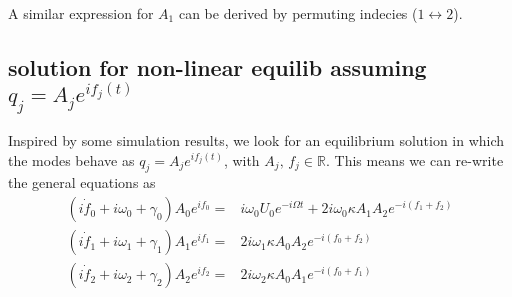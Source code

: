 A similar expression for $A_1$ can be derived by permuting indecies ($1 \leftrightarrow 2$).

\subsection*{solution for non-linear equilib assuming $q_j = A_j e^{i f_j(t)}$}

Inspired by some simulation results, we look for an equilibrium solution in which the modes behave as $q_j = A_j e^{if_j(t)}$, with $A_j,\,f_j \in \mathbb{R}$. This means we can re-write the general equations as
\begin{subequations}
\begin{align}
(i\dot{f}_0 + i\omega_0 + \gamma_0) A_0 e^{if_0} = & i\omega_0 U_0 e^{-i\Omega t} + 2i\omega_0 \kappa A_1 A_2 e^{-i(f_1 + f_2)} \label{subeq:f_0}\\
(i\dot{f}_1 + i\omega_1 + \gamma_1) A_1 e^{if_1} = & 2i\omega_1 \kappa A_0 A_2 e^{-i(f_0 + f_2)} \label{subeq:f_1}\\
(i\dot{f}_2 + i\omega_2 + \gamma_2) A_2 e^{if_2} = & 2i\omega_2 \kappa A_0 A_1 e^{-i(f_0 + f_1)} \label{subeq:f_2}
\end{align}
\end{subequations}

